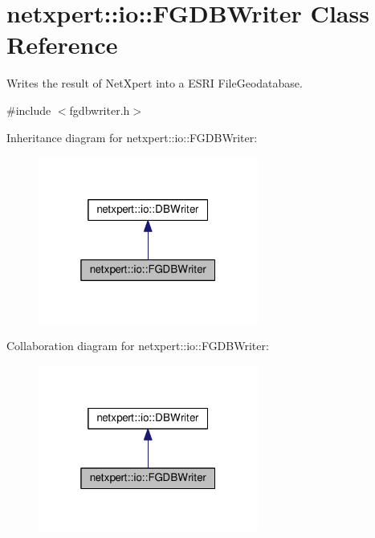 \hypertarget{classnetxpert_1_1io_1_1FGDBWriter}{}\section{netxpert\+:\+:io\+:\+:F\+G\+D\+B\+Writer Class Reference}
\label{classnetxpert_1_1io_1_1FGDBWriter}


Writes the result of Net\+Xpert into a E\+S\+RI File\+Geodatabase.  




{\ttfamily \#include $<$fgdbwriter.\+h$>$}



Inheritance diagram for netxpert\+:\+:io\+:\+:F\+G\+D\+B\+Writer\+:\nopagebreak
\begin{figure}[H]
\begin{center}
\leavevmode
\includegraphics[width=205pt]{classnetxpert_1_1io_1_1FGDBWriter__inherit__graph}
\end{center}
\end{figure}


Collaboration diagram for netxpert\+:\+:io\+:\+:F\+G\+D\+B\+Writer\+:\nopagebreak
\begin{figure}[H]
\begin{center}
\leavevmode
\includegraphics[width=205pt]{classnetxpert_1_1io_1_1FGDBWriter__coll__graph}
\end{center}
\end{figure}
